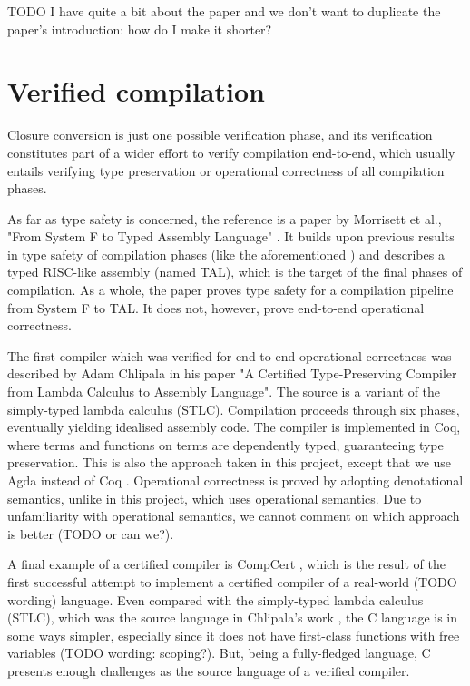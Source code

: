 \documentclass[bsc,frontabs,twoside,singlespacing,parskip,deptreport]{infthesis}
\theoremstyle{definition}
\begin{document}
TODO I have quite a bit about the paper and we don't want to duplicate
the paper's introduction: how do I make it shorter?

\section{Verified compilation}

Closure conversion is just one possible verification phase, and its
verification constitutes part of a wider effort to verify compilation
end-to-end, which usually entails verifying type preservation or
operational correctness of all compilation phases.

As far as type safety is concerned, the reference is a paper by
Morrisett et al., "From System F to Typed Assembly Language"
\cite{TODO}. It builds upon previous results in type safety of
compilation phases (like the aforementioned \cite{TCC}) and describes
a typed RISC-like assembly (named TAL), which is the target of the
final phases of compilation. As a whole, the paper proves type safety
for a compilation pipeline from System F to TAL. It does not, however,
prove end-to-end operational correctness.

The first compiler which was verified for end-to-end operational
correctness was described by Adam Chlipala in his paper "A Certified
Type-Preserving Compiler from Lambda Calculus to Assembly
Language". The source is a variant of the simply-typed lambda calculus
(STLC). Compilation proceeds through six phases, eventually yielding
idealised assembly code. The compiler is implemented in Coq, where
terms and functions on terms are dependently typed, guaranteeing type
preservation. This is also the approach taken in this project, except
that we use Agda instead of Coq \cite{TODO}. Operational
correctness is proved by adopting denotational semantics, unlike in
this project, which uses operational semantics. Due to unfamiliarity
with operational semantics, we cannot comment on which approach is
better (TODO or can we?).

A final example of a certified compiler is CompCert \cite{TODOcompcert}, which is the result of the first successful attempt to
implement a certified compiler of a real-world (TODO wording)
language. Even compared with the simply-typed lambda calculus (STLC),
which was the source language in Chlipala's work \cite{TODO}, the C
language is in some ways simpler, especially since it does not have
first-class functions with free variables (TODO wording:
scoping?). But, being a fully-fledged language, C presents enough
challenges as the source language of a verified compiler.
\end{document}
